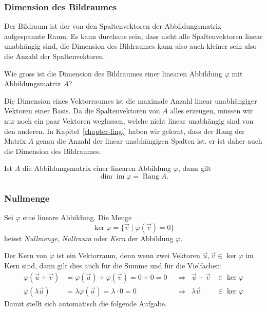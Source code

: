 \subsubsection{Dimension des Bildraumes}
Der Bildraum ist der von den Spaltenvektoren der Abbildungsmatrix
aufgespannte Raum.
Es kann durchaus sein, dass nicht alle Spaltenvektoren linear unabhängig
sind, die Dimension des Bildraumes kann also auch kleiner sein also die
Anzahl der Spaltenvektoren.

\begin{aufgabe}
Wie gross ist die Dimension des Bildraumes einer linearen Abbildung
$\varphi$ mit Abbildungsmatrix $A$?
\end{aufgabe}
Die Dimension eines Vektorraumes ist die maximale Anzahl linear
unabhängiger Vektoren einer Basis.
Da die Spaltenvektoren von $A$ alles erzeugen, müssen wir nur noch
ein paar Vektoren weglassen, welche nicht linear unabhängig sind von
den anderen.
In Kapitel~\ref{chapter-lingl} haben wir gelernt, dass der Rang der
Matrix $A$ genau die Anzahl der linear unabhängigen Spalten ist.
er ist daher auch die Dimension des Bildraumes.

\begin{satz}
Ist $A$ die Abbildungsmatrix einer linearen Abbildung $\varphi$, dann
gilt
\[
\dim\operatorname{im}\varphi = \operatorname{Rang}A.
\]
\end{satz}

\subsubsection{Nullmenge}
\begin{definition}
Sei $\varphi$ eine lineare Abbildung.
Die Menge
\[
\operatorname{ker}\varphi = \{\vec{v}\;|\; \varphi(\vec{v}) = 0\}
\]
heisst {\em Nullmenge}, {\em Nullraum} oder {\em Kern} der Abbildung 
$\varphi$.
\end{definition}

Der Kern von $\varphi$ ist ein Vektorraum, denn wenn zwei Vektoren
$\vec{u},\vec{v}\in\ker\varphi$ im Kern sind, dann gilt dies
auch für die Summe und für die Vielfachen:
\[
\begin{aligned}
\varphi(\vec{u}+\vec{v})
&=
\varphi(\vec{u})+\varphi(\vec{v})
=
0+0=0
&&\Rightarrow&
\vec{u}+\vec{v}&\in\ker\varphi
\\
\varphi(\lambda\vec{u})
&=
\lambda\varphi(\vec{u}) = \lambda\cdot 0=0
&&\Rightarrow&
\lambda\vec{u}&\in\ker\varphi
\end{aligned}
\]
Damit stellt sich automatisch die folgende Aufgabe.

